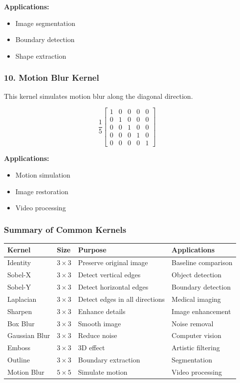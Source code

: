 \documentclass[11pt]{article}
\begin{document}
\textbf{Applications:}
\begin{itemize}
\item Image segmentation
\item Boundary detection
\item Shape extraction
\end{itemize}

\subsubsection*{10. Motion Blur Kernel}

This kernel simulates motion blur along the diagonal direction.

\[
\frac{1}{5}
\begin{bmatrix}
1 & 0 & 0 & 0 & 0\\
0 & 1 & 0 & 0 & 0\\
0 & 0 & 1 & 0 & 0\\
0 & 0 & 0 & 1 & 0\\
0 & 0 & 0 & 0 & 1
\end{bmatrix}
\]

\textbf{Applications:}
\begin{itemize}
\item Motion simulation
\item Image restoration
\item Video processing
\end{itemize}

\subsubsection*{Summary of Common Kernels}

\begin{center}
\renewcommand{\arraystretch}{1.3}
\begin{tabular}{|p{3cm}|p{2cm}|p{4cm}|p{4cm}|}
\hline
\textbf{Kernel} & \textbf{Size} & \textbf{Purpose} & \textbf{Applications}\\
\hline
Identity & $3\times3$ & Preserve original image & Baseline comparison\\
\hline
Sobel-X & $3\times3$ & Detect vertical edges & Object detection\\
\hline
Sobel-Y & $3\times3$ & Detect horizontal edges & Boundary detection\\
\hline
Laplacian & $3\times3$ & Detect edges in all directions & Medical imaging\\
\hline
Sharpen & $3\times3$ & Enhance details & Image enhancement\\
\hline
Box Blur & $3\times3$ & Smooth image & Noise removal\\
\hline
Gaussian Blur & $3\times3$ & Reduce noise & Computer vision\\
\hline
Emboss & $3\times3$ & 3D effect & Artistic filtering\\
\hline
Outline & $3\times3$ & Boundary extraction & Segmentation\\
\hline
Motion Blur & $5\times5$ & Simulate motion & Video processing\\
\hline
\end{tabular}
\end{center}
\end{document}

